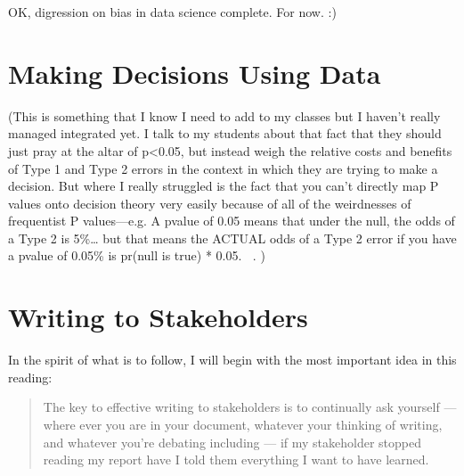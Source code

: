 \documentclass[letterpaper,10pt,english]{jupyterBook}
\begin{document}
\sphinxAtStartPar
OK, digression on bias in data science complete. For now. :)

\sphinxstepscope


\chapter{Making Decisions Using Data}
\label{\detokenize{40_in_practice/20_from_data_to_decisions:making-decisions-using-data}}\label{\detokenize{40_in_practice/20_from_data_to_decisions::doc}}
\sphinxAtStartPar
(This is something that I know I need to add to my classes but I haven’t really managed integrated yet. I talk to my students about that fact that they should just pray at the altar of p<0.05, but instead weigh the relative costs and benefits of Type 1 and Type 2 errors in the context in which they are trying to make a decision. But where I really struggled is the fact that you can’t directly map P values onto decision theory very easily because of all of the weirdnesses of frequentist P values—e.g. A p\sphinxhyphen{}value of 0.05 means that under the null, the odds of a Type 2 is 5\%… but that means the ACTUAL odds of a Type 2 error if you have a p\sphinxhyphen{}value of 0.05\% is pr(null is true) * 0.05. 🤦‍♂️. )

\sphinxstepscope


\chapter{Writing to Stakeholders}
\label{\detokenize{40_in_practice/25_writing_to_stakeholders:writing-to-stakeholders}}\label{\detokenize{40_in_practice/25_writing_to_stakeholders::doc}}
\sphinxAtStartPar
In the spirit of what is to follow, I will begin with the most important idea in this reading:
\begin{quote}

\sphinxAtStartPar
The key to effective writing to stakeholders is to continually ask yourself — where ever you are in your document, whatever your thinking of writing, and whatever you’re debating including — if my stakeholder stopped reading my report  have I told them everything I want  to have learned.
\end{quote}
\end{document}
